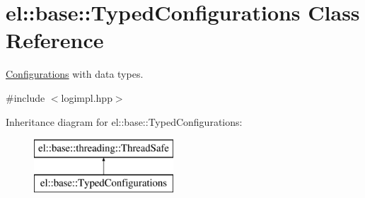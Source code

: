 \hypertarget{classel_1_1base_1_1TypedConfigurations}{\section{el\-:\-:base\-:\-:Typed\-Configurations Class Reference}
\label{classel_1_1base_1_1TypedConfigurations}
}


\hyperlink{classel_1_1Configurations}{Configurations} with data types.  




{\ttfamily \#include $<$logimpl.\-hpp$>$}

Inheritance diagram for el\-:\-:base\-:\-:Typed\-Configurations\-:\begin{figure}[H]
\begin{center}
\leavevmode
\includegraphics[height=2.000000cm]{classel_1_1base_1_1TypedConfigurations}
\end{center}
\end{figure}
